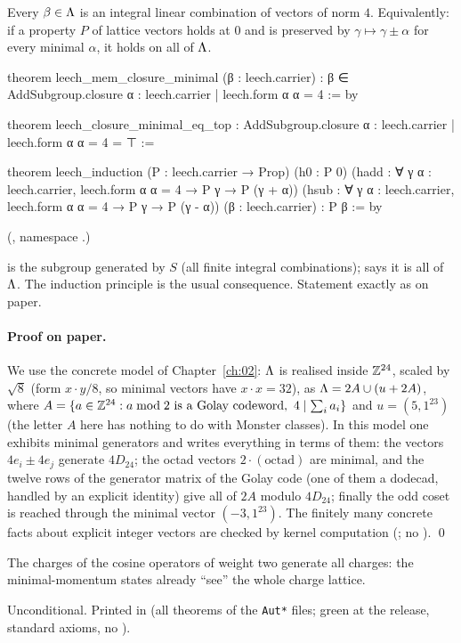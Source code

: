 \begin{theorem}\label{ch20:thm:leechspan}
Every $\beta\in{\Lambda}$ is an integral linear combination of vectors of norm $4$.  Equivalently: if a property $P$ of
lattice vectors holds at $0$ and is preserved by $\gamma\mapsto\gamma\pm\alpha$ for every minimal $\alpha$, it holds on
all of ${\Lambda}$.
\end{theorem}
\begin{leancode}
theorem leech_mem_closure_minimal (β : leech.carrier) :
    β ∈ AddSubgroup.closure {α : leech.carrier | leech.form α α = 4} := by

theorem leech_closure_minimal_eq_top :
    AddSubgroup.closure {α : leech.carrier | leech.form α α = 4} = ⊤ :=

theorem leech_induction (P : leech.carrier → Prop) (h0 : P 0)
    (hadd : ∀ γ α : leech.carrier, leech.form α α = 4 → P γ → P (γ + α))
    (hsub : ∀ γ α : leech.carrier, leech.form α α = 4 → P γ → P (γ - α))
    (β : leech.carrier) : P β := by
\end{leancode}
(, namespace .)
\begin{dictionary}
 is the subgroup generated by $S$ (all finite integral combinations);  says it is
all of ${\Lambda}$.  The induction principle is the usual consequence.  Statement exactly as on paper.
\end{dictionary}
\paragraph{Proof on paper.}  We use the concrete model of Chapter~\ref{ch:02}: ${\Lambda}$ is realised inside ${\mathbb{Z}}^{24}$, scaled
by $\sqrt8$ (form $x\cdot y/8$, so minimal vectors have $x\cdot x=32$), as ${\Lambda}=2A\cup(u+2A)$, where
$A=\{a\in{\mathbb{Z}}^{24}: a\bmod2\text{ is a Golay codeword},\ 4\mid\sum_ia_i\}$ and $u=(5,1^{23})$ (the letter $A$ here has nothing to do
with Monster classes).  In this model one exhibits minimal generators and writes everything in terms of them:
the vectors $4e_i\pm4e_j$ generate $4D_{24}$; the octad vectors $2\cdot(\text{octad})$ are minimal, and the twelve
rows of the generator matrix of the Golay code (one of them a dodecad, handled by an explicit identity) give all of
$2A$ modulo $4D_{24}$; finally the odd coset is reached through the minimal vector $(-3,1^{23})$.  The finitely many
concrete facts about explicit integer vectors are checked by kernel computation (; no
). \qed
\begin{physics}
The charges of the cosine operators of weight two generate all charges: the minimal-momentum states already ``see''
the whole charge lattice.
\end{physics}
\begin{status}
Unconditional.  Printed in  (all theorems of the \texttt{Aut*} files; green at the release, standard axioms, no ).
\end{status}

